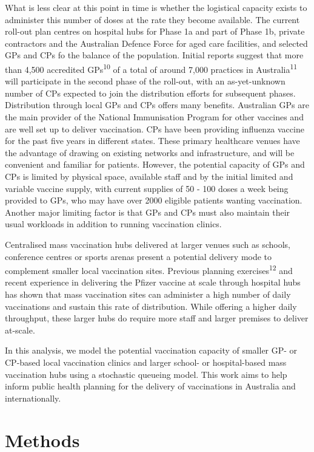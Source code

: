 \documentclass{article}
\begin{document}
What is less clear at this point in time is whether the logistical
capacity exists to administer this number of doses at the rate they
become available. The current roll-out plan centres on hospital hubs for
Phase 1a and part of Phase 1b, private contractors and the Australian
Defence Force for aged care facilities, and selected GPs and CPs fo the
balance of the population. Initial reports suggest that more than 4,500
accredited GPs\textsuperscript{10} of a total of around 7,000 practices
in Australia\textsuperscript{11} will participate in the second phase of
the roll-out, with an as-yet-unknown number of CPs expected to join the
distribution efforts for subsequent phases. Distribution through local
GPs and CPs offers many benefits. Australian GPs are the main provider
of the National Immunisation Program for other vaccines and are well set
up to deliver vaccination. CPs have been providing influenza vaccine for
the past five years in different states. These primary healthcare venues
have the advantage of drawing on existing networks and infrastructure,
and will be convenient and familiar for patients. However, the potential
capacity of GPs and CPs is limited by physical space, available staff
and by the initial limited and variable vaccine supply, with current
supplies of 50 - 100 doses a week being provided to GPs, who may have
over 2000 eligible patients wanting vaccination. Another major limiting
factor is that GPs and CPs must also maintain their usual workloads in
addition to running vaccination clinics.

Centralised mass vaccination hubs delivered at larger venues such as
schools, conference centres or sports arenas present a potential
delivery mode to complement smaller local vaccination sites. Previous
planning exercises\textsuperscript{12} and recent experience in
delivering the Pfizer vaccine at scale through hospital hubs has shown
that mass vaccination sites can administer a high number of daily
vaccinations and sustain this rate of distribution. While offering a
higher daily throughput, these larger hubs do require more staff and
larger premises to deliver at-scale.

In this analysis, we model the potential vaccination capacity of smaller
GP- or CP-based local vaccination clinics and larger school- or
hospital-based mass vaccination hubs using a stochastic queueing model.
This work aims to help inform public health planning for the delivery of
vaccinations in Australia and internationally.

\hypertarget{methods}{%
\section{Methods}\label{methods}}
\end{document}
